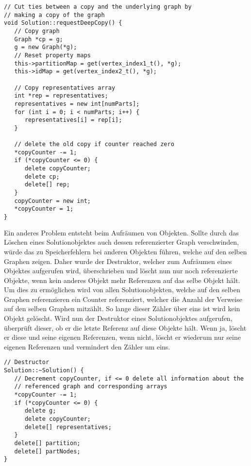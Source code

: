 \singlespacing
\begin{lstlisting}[caption={Die Methode \texttt{requestDeepCopy} der Solution Klasse},label={lst:deepcopy}]
// Cut ties between a copy and the underlying graph by 
// making a copy of the graph
void Solution::requestDeepCopy() {
   // Copy graph
   Graph *cp = g;
   g = new Graph(*g);
   // Reset property maps
   this->partitionMap = get(vertex_index1_t(), *g);
   this->idMap = get(vertex_index2_t(), *g);

   // Copy representatives array
   int *rep = representatives;
   representatives = new int[numParts];
   for (int i = 0; i < numParts; i++) {
      representatives[i] = rep[i];
   }

   // delete the old copy if counter reached zero
   *copyCounter -= 1;
   if (*copyCounter <= 0) {
      delete copyCounter;
      delete cp;
      delete[] rep;
   }
   copyCounter = new int;
   *copyCounter = 1;
}
\end{lstlisting}

Ein anderes Problem entsteht beim Aufräumen von Objekten. Sollte durch das Löschen eines Solutionobjektes auch dessen referenzierter Graph verschwinden, würde das zu Speicherfehlern bei anderen Objekten führen, 
welche auf den selben Graphen zeigen. Daher wurde der Destruktor, welcher zum Aufräumen eines Objektes aufgerufen wird, überschrieben und löscht nun nur noch referenzierte Objekte, wenn kein anderes Objekt
mehr Referenzen auf das selbe Objekt hält. Um dies zu ermöglichen wird von allen Solutionobjekten, welche auf den selben Graphen referenzieren ein Counter referenziert, welcher die Anzahl der
Verweise auf den selben Graphen mitzählt. So lange dieser Zähler über eins ist wird kein Objekt gelöscht. Wird nun der Destruktor eines Solutionobjektes aufgerufen, überprüft dieser, ob er die letzte
Referenz auf diese Objekte hält. Wenn ja, löscht er diese und seine eigenen Referenzen, wenn nicht, löscht er wiederum nur seine eigenen Referenzen und vermindert den Zähler um eins.

\singlespacing
\begin{lstlisting}[caption={Der Destruktor der Solutionklasse mit Rücksichtnahme auf eventuelle verbleibende Referenzen},label={lst:destruct}]
// Destructor
Solution::~Solution() {
   // Decrement copyCounter, if <= 0 delete all information about the 
   // referenced graph and corresponding arrays
   *copyCounter -= 1;
   if (*copyCounter <= 0) {
      delete g;
      delete copyCounter;
      delete[] representatives;
   }
   delete[] partition;
   delete[] partNodes;
}
\end{lstlisting}

